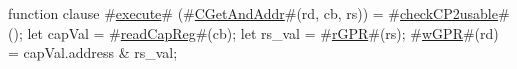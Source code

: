 function clause #\hyperref[zexecute]{execute}# (#\hyperref[zCGetAndAddr]{CGetAndAddr}#(rd, cb, rs)) =
{
  #\hyperref[zcheckCP2usable]{checkCP2usable}#();
  let capVal = #\hyperref[zreadCapReg]{readCapReg}#(cb);
  let rs_val = #\hyperref[zrGPR]{rGPR}#(rs);
  #\hyperref[zwGPR]{wGPR}#(rd) = capVal.address & rs_val;
}
